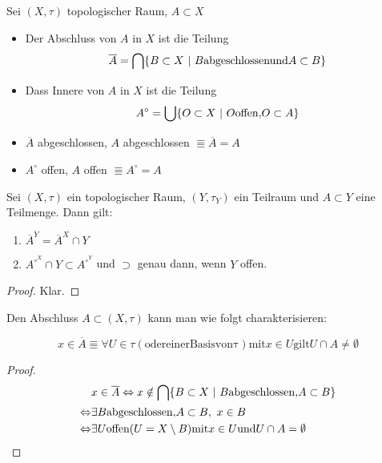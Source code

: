 \begin{dfn}
    Sei $(X,\tau)$ topologischer Raum, $A\subset X$
    \begin{itemize}
        \item Der Abschluss von $A$ in $X$ ist die Teilung
            \[\overline{A} = \bigcap\mdef[B\subset X]{B \mathrm{ abgeschlossen und }
            A\subset B}\]
        \item Dass Innere von $A$ in $X$ ist die Teilung
            \[A^\circ = \bigcup\mdef[O\subset X]{O\mathrm{ offen, } O\subset A}\]
    \end{itemize}
    \begin{bem}
        \begin{itemize}
            \item $\overline{A}$ abgeschlossen, $A$ abgeschlossen $\Equiv
                \overline{A} = A$
            \item $A^\circ$ offen, $A$ offen $\Equiv A^\circ = A$
        \end{itemize}
    \end{bem}
\end{dfn}

\begin{stz}
    Sei $(X,\tau)$ ein topologischer Raum, $(Y,\tau_Y)$ ein Teilraum und $A\subset Y$
    eine Teilmenge. Dann gilt:
    \begin{enumerate}
        \item $\overline{A}^Y = \overline{A}^X \cap Y$
        \item $A^{\circ^X} \cap Y \subset A^{\circ^Y}$ und $\supset$ genau dann, wenn
            $Y$ offen.
    \end{enumerate}
    \begin{proof}
        Klar.
    \end{proof}
\end{stz}

\begin{stz}
    Den Abschluss $A\subset(X,\tau)$ kann man wie folgt charakterisieren:
    
    \[x\in \overline{A} \Equiv \forall U\in \tau\mathrm{ (oder einer Basis von
    \tau) mit } x\in U \mathrm{ gilt } U\cap A \neq \emptyset\]
    \begin{proof}
        \begin{align*}
            & x\in\overline{A} \Equiv x\notin
            \bigcap \mdef[B\subset X]{B \mathrm{ abgeschlossen, } A\subset B} \\
            \Equiv & \exists B \mathrm{ abgeschlossen, } A\subset B,\ x\in B \\
            \Equiv & \exists U \mathrm{ offen (}U = X\setminus B\mathrm{) mit } x\in U
            \mathrm{ und } U\cap A = \emptyset
        \end{align*}
    \end{proof}
\end{stz}

